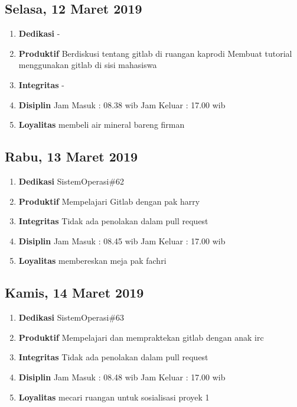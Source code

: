 \subsection{Selasa, 12 Maret 2019}
\begin{enumerate}
\item \textbf{Dedikasi}
\subitem -
\item \textbf{Produktif}
\subitem Berdiskusi tentang gitlab di ruangan kaprodi 
\subitem Membuat tutorial menggunakan gitlab di sisi mahasiswa
\item \textbf{Integritas}
\subitem -
\item \textbf{Disiplin}
\subitem Jam Masuk : 08.38 wib
\subitem Jam Keluar : 17.00 wib
\item \textbf{Loyalitas}
\subitem membeli air mineral bareng firman
\end{enumerate}

\subsection{Rabu, 13 Maret 2019}
\begin{enumerate}
\item \textbf{Dedikasi}
\subitem SistemOperasi\#62
\item \textbf{Produktif}
\subitem Mempelajari Gitlab dengan pak harry 
\item \textbf{Integritas}
\subitem Tidak ada penolakan dalam pull request
\item \textbf{Disiplin}
\subitem Jam Masuk : 08.45 wib
\subitem Jam Keluar : 17.00 wib
\item \textbf{Loyalitas}
\subitem membereskan meja pak fachri
\end{enumerate}

\subsection{Kamis, 14 Maret 2019}
\begin{enumerate}
\item \textbf{Dedikasi}
\subitem SistemOperasi\#63
\item \textbf{Produktif}
\subitem Mempelajari dan mempraktekan gitlab dengan anak irc 
\item \textbf{Integritas}
\subitem Tidak ada penolakan dalam pull request
\item \textbf{Disiplin}
\subitem Jam Masuk : 08.48 wib
\subitem Jam Keluar : 17.00 wib
\item \textbf{Loyalitas}
\subitem mecari ruangan untuk sosialisasi proyek 1
\end{enumerate}

